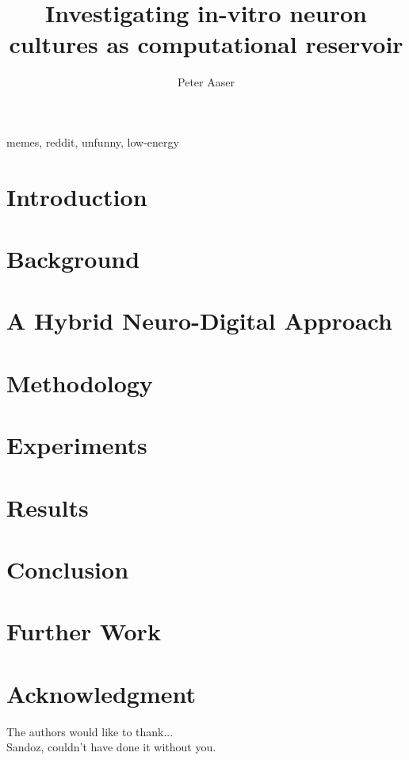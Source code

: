 \documentclass[journal]{IEEEtran}
\begin{document}
\title{Investigating in-vitro neuron cultures as computational reservoir}

\author{Peter Aaser}
%
\maketitle

\begin{abstract}
  \blindtext[2]

\end{abstract}

\begin{IEEEkeywords}
memes, reddit, unfunny, low-energy
\end{IEEEkeywords}

\section{Introduction}

\section{Background}

\section{A Hybrid Neuro-Digital Approach}

\section{Methodology}

\section{Experiments}

\section{Results}

\section{Conclusion}

\section{Further Work}



\section*{Acknowledgment}
The authors would like to thank...\\
Sandoz, couldn't have done it without you.


 

\end{document}
